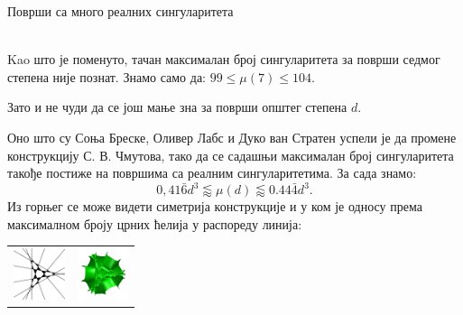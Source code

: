 \documentclass[sr]{./../../common/SurferDesc}%
\begin{document}
\footnotesize




\begin{surferPage}
  \begin{surferTitle}Површи са много реалних сингуларитета\end{surferTitle}   \\
    Kao што је поменуто, тачан максималан број сингуларитета за површи 
	седмог степена није познат.
    Знамо само да: $99\le \mu(7) \le 104$. 


    Зато и не чуди да се још мање зна за површи општег степена  $d$. 

    Оно што су Соња Бреске, Оливер Лабс и Дуко ван Стратен успели је да промене 
	конструкцију С. В. Чмутова, тако да се садашњи максималан број сингуларитета такође 
	постиже на површима са реалним сингуларитетима. 
    За сада знамо:
    \[0,41\bar{6}d^3 \lessapprox \mu(d) \lessapprox 0.44\bar{4} d^3.\]
     Из горњег се може видети симетрија конструкције и у ком је односу према максималном 
	 броју црних ћелија у распореду линија:
    \begin{center}
      \begin{tabular}{c@{\qquad}c}
        \includegraphics[height=1.5cm]{./../../common/images/vielesing.pdf}
        &
        \includegraphics[height=1.5cm]{./../../common/images/p9surface_von_oben}
      \end{tabular}
    \end{center}

  \begin{surferText}
     \end{surferText}
\end{surferPage}
\end{document}
